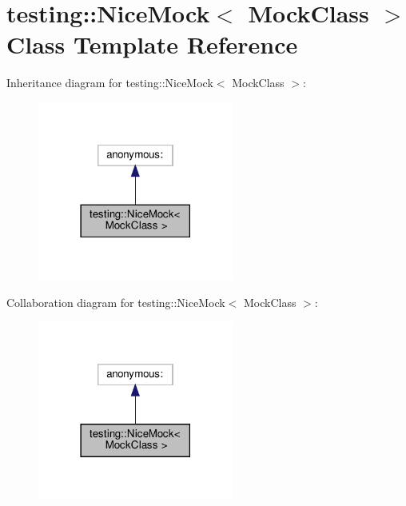 \hypertarget{classtesting_1_1_nice_mock}{}\section{testing\+:\+:Nice\+Mock$<$ Mock\+Class $>$ Class Template Reference}
\label{classtesting_1_1_nice_mock}


Inheritance diagram for testing\+:\+:Nice\+Mock$<$ Mock\+Class $>$\+:
\nopagebreak
\begin{figure}[H]
\begin{center}
\leavevmode
\includegraphics[width=182pt]{classtesting_1_1_nice_mock__inherit__graph}
\end{center}
\end{figure}


Collaboration diagram for testing\+:\+:Nice\+Mock$<$ Mock\+Class $>$\+:
\nopagebreak
\begin{figure}[H]
\begin{center}
\leavevmode
\includegraphics[width=182pt]{classtesting_1_1_nice_mock__coll__graph}
\end{center}
\end{figure}
